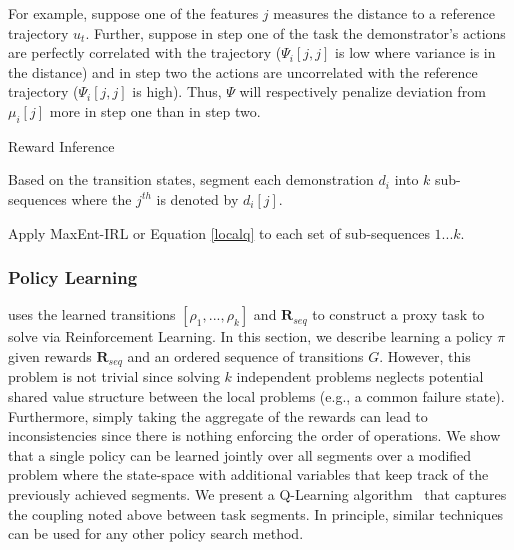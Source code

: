 For example, suppose one of the features $j$ measures the distance to a reference trajectory $u_t$. 
Further, suppose in step one of the task the demonstrator's actions are perfectly correlated with the trajectory ($\Psi_{i}[j,j]$ is low where variance is in the distance) and in step two the actions are uncorrelated with the reference trajectory ($\Psi_{i}[j,j]$ is high).
Thus, $\Psi$ will respectively penalize deviation from $\mu_{i}[j]$ more in step one than in step two.


\begin{algorithmic}[t]
\small
\DontPrintSemicolon
\caption{Reward Inference \label{alg:tsh2}}

Based on the transition states, segment each demonstration $d_i$ into $k$ sub-sequences where the $j^{th}$ is denoted by $d_i[j]$.

Apply MaxEnt-IRL or  Equation \ref{localq} to each set of sub-sequences $1...k$.

\end{algorithmic}



\subsubsection{Policy Learning}
 \hirl uses the learned transitions $[\rho_1,...,\rho_k]$ and $\mathbf{R}_{seq}$ to construct a proxy task to solve via Reinforcement Learning. In this section, we describe learning a policy $\pi$ given rewards $\mathbf{R}_{seq}$ and an ordered sequence of transitions $G$.
However, this problem is not trivial since solving $k$ independent problems neglects potential shared value structure between the local problems (e.g., a common failure state).
Furthermore, simply taking the aggregate of the rewards can lead to inconsistencies since there is nothing enforcing the order of operations.
We show that a single policy can be learned jointly over all segments over a modified problem where the state-space with additional variables that keep track of the previously achieved segments.
We present a Q-Learning algorithm~\cite{mnih2015human,sutton1998reinforcement} that captures the coupling noted above between task segments.
In principle, similar techniques can be used for any other policy search method.


